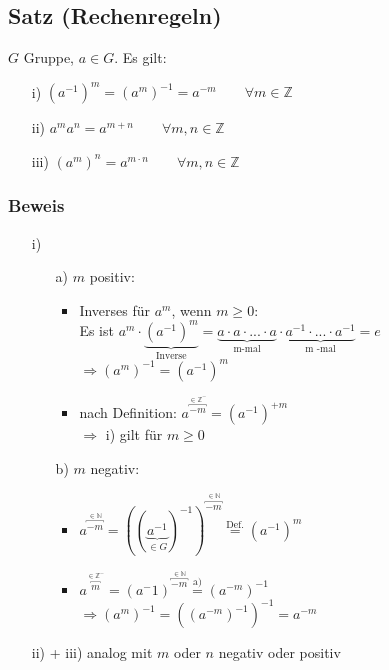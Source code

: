 \documentclass[a4paper, 12pt,titlepage, pdf, headsepline]{scrartcl}
\renewcommand{\>}{\rightarrow}
\renewcommand{\*}{\cdot}
\begin{document}
	      \subsection{Satz (Rechenregeln)}
	      $G$ Gruppe, $a \in G$. Es gilt:
	      \begin{itemize}
	      	\item[i)] $(a^{-1})^m = (a^m)^{-1} = a^{-m} \qquad \forall m \in \mathds{Z}$
	      	\item[ii)] $a^ma^n = a^{m+n} \qquad \forall m,n \in \mathds{Z}$
	      	\item[iii)] $(a^m)^n = a^{m \cdot n} \qquad \forall m,n \in \mathds{Z}$
	      \end{itemize}
	      \subsubsection*{Beweis}
	      \begin{itemize}
	      	\item[i)] 
	      	      \begin{itemize}
	      	      	\item[a)] $m$ positiv:
	      	      	      \begin{itemize}
	      	      	      	\item Inverses für $a^m$, wenn $m \geq 0:$ \\
	      	      	      	      Es ist $a^m  \cdot \underbrace{(a^{-1})^m}_{\text{Inverse}} = \underbrace{a \cdot a \cdot ... \cdot a}_{\text{m-mal}} \cdot \underbrace{ a^{-1} \cdot ... \cdot a^{-1}}_{\text{m -mal}} = e$ \\
	      	      	      	      $\Rightarrow (a^m)^{-1}= (a^{-1})^m$
	      	      	      	\item nach Definition: $a^{\overbracket{-m}^{\in \mathds{Z^-}}} = (a^{-1})^{+m}$ \\
	      	      	      	      $\Rightarrow$ i) gilt für $m \geq 0$
	      	      	      \end{itemize}
	      	      	\item[b)] $m$ negativ:
	      	      	      \begin{itemize}
	      	      	      	\item $a^{\overbracket{-m}^{ \in \mathds{N}}} = ((\underbrace{a^{-1}}_{\in G})^{-1})^{\overbracket{-m}^{ \in \mathds{N}}} \overset{\textrm{Def.}}{=} (a^{-1})^m$
	      	      	      	\item $a^{\overbracket{m}^{ \in \mathds{Z}^-}} = (a^-1)^{\overbracket{-m}^{ \in \mathds{N}}} \overset{\textrm{a)}}{=} (a^{-m})^{-1}$\\$ \Rightarrow (a^m)^{-1} = ((a^{-m})^{-1})^{-1} = a^{-m}$
	      	      	      \end{itemize}	
	      	      \end{itemize}
	      	\item[ii) + iii)] analog mit $m$ oder $n$ negativ oder positiv 
	      \end{itemize}
\end{document}
